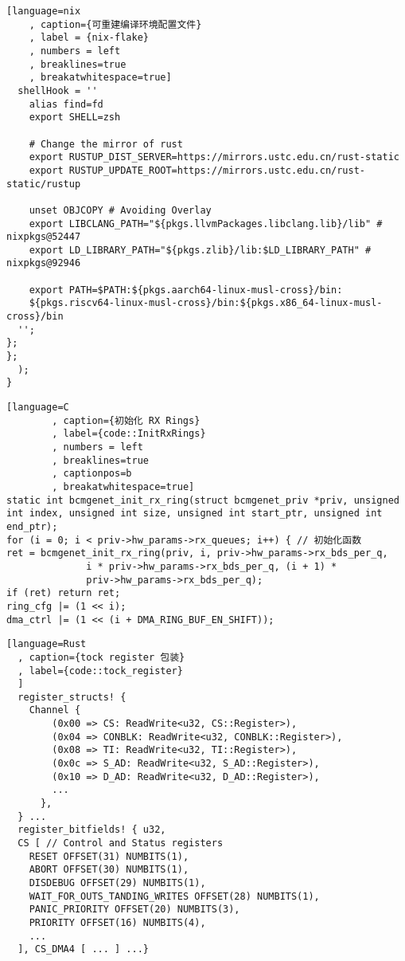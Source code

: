 \begin{lstlisting}[language=nix
    , caption={可重建编译环境配置文件}
    , label = {nix-flake}
    , numbers = left
    , breaklines=true
    , breakatwhitespace=true]
  shellHook = ''
    alias find=fd
    export SHELL=zsh

    # Change the mirror of rust
    export RUSTUP_DIST_SERVER=https://mirrors.ustc.edu.cn/rust-static
    export RUSTUP_UPDATE_ROOT=https://mirrors.ustc.edu.cn/rust-static/rustup

    unset OBJCOPY # Avoiding Overlay
    export LIBCLANG_PATH="${pkgs.llvmPackages.libclang.lib}/lib" # nixpkgs@52447
    export LD_LIBRARY_PATH="${pkgs.zlib}/lib:$LD_LIBRARY_PATH" # nixpkgs@92946
  
    export PATH=$PATH:${pkgs.aarch64-linux-musl-cross}/bin:
    ${pkgs.riscv64-linux-musl-cross}/bin:${pkgs.x86_64-linux-musl-cross}/bin
  '';
};
};
  );
}      
\end{lstlisting}

\begin{lstlisting}[language=C
        , caption={初始化 RX Rings}
        , label={code::InitRxRings}
        , numbers = left
        , breaklines=true
        , captionpos=b
        , breakatwhitespace=true]
static int bcmgenet_init_rx_ring(struct bcmgenet_priv *priv, unsigned int index, unsigned int size, unsigned int start_ptr, unsigned int end_ptr);
for (i = 0; i < priv->hw_params->rx_queues; i++) { // 初始化函数
ret = bcmgenet_init_rx_ring(priv, i, priv->hw_params->rx_bds_per_q,
              i * priv->hw_params->rx_bds_per_q, (i + 1) *
              priv->hw_params->rx_bds_per_q);
if (ret) return ret;
ring_cfg |= (1 << i);
dma_ctrl |= (1 << (i + DMA_RING_BUF_EN_SHIFT));
\end{lstlisting}

\begin{lstlisting}[language=Rust
  , caption={tock register 包装}
  , label={code::tock_register}
  ]
  register_structs! {
    Channel {
        (0x00 => CS: ReadWrite<u32, CS::Register>),
        (0x04 => CONBLK: ReadWrite<u32, CONBLK::Register>),
        (0x08 => TI: ReadWrite<u32, TI::Register>),
        (0x0c => S_AD: ReadWrite<u32, S_AD::Register>),
        (0x10 => D_AD: ReadWrite<u32, D_AD::Register>),
        ...
      },
  } ...
  register_bitfields! { u32,
  CS [ // Control and Status registers
    RESET OFFSET(31) NUMBITS(1),
    ABORT OFFSET(30) NUMBITS(1),
    DISDEBUG OFFSET(29) NUMBITS(1),
    WAIT_FOR_OUTS_TANDING_WRITES OFFSET(28) NUMBITS(1),
    PANIC_PRIORITY OFFSET(20) NUMBITS(3),
    PRIORITY OFFSET(16) NUMBITS(4),
    ...
  ], CS_DMA4 [ ... ] ...}
\end{lstlisting}

